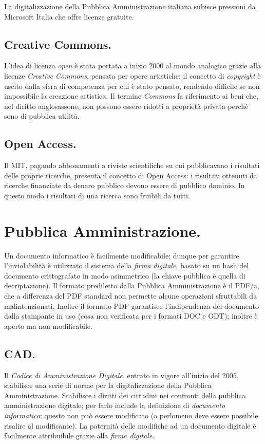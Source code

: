 \documentclass[a4page, 11pt, twocolumn]{article}
\begin{document}
La digitalizzazione della Pubblica Amministrazione italiana subisce pressioni da Microsoft Italia che offre licenze gratuite.

\subsection{Creative Commons.}
L'idea di licenza \textit{open} è stata portata a inizio 2000 al mondo analogico grazie alla licenze \textit{Creative Commons}, pensata per opere artistiche: il concetto di \textit{copyright} è uscito dalla sfera di competenza per cui è stato pensato, rendendo difficile se non impossibile la creazione artistica.
Il termine \textit{Commons} fa riferimento ai beni che, nel diritto anglosassone, non possono essere ridotti a proprietà privata perchè sono di pubblica utilità.

\subsection{Open Access.}
Il MIT, pagando abbonamenti a riviste scientifiche su cui pubblicavano i risultati delle proprie ricerche, presenta il concetto di Open Access: i risultati ottenuti da ricerche finanziate da denaro pubblico devono essere di pubblico dominio.
In questo modo i risultati di una ricerca sono fruibili da tutti.

\section{Pubblica Amministrazione.}
Un documento informatico è facilmente modificabile; dunque per garantire l'inviolabilità è utilizzato il sistema della \textit{firma digitale}, basato su un hash del documento crittografato in modo asimmetrico (la chiave pubblica è quella di decriptazione).
Il formato prediletto dalla Pubblica Amministrazione è il PDF/a, che a differenza del PDF standard non permette alcune operazioni sfruttabili da malintenzionati.
Inoltre il formato PDF garantisce l'indipendenza del documento dalla stampante in uso (cosa non verificata per i formati DOC e ODT); inoltre è aperto ma non modificabile.

\subsection{CAD.}
Il \textit{Codice di Amministrazione Digitale}, entrato in vigore all'inizio del 2005, stabilisce una serie di norme per la digitalizzazione della Pubblica Amministrazione.
Stabilisce i diritti dei cittadini nei confronti della pubblica amministrazione digitale; per farlo include la definizione di \textit{documento informatico}: questo non può essere modificato (o perlomeno deve essere possibile risalire al modificante).
La paternità delle modifiche ad un documento digitale è facilmente attribuibile grazie alla \textit{firma digitale}.
\end{document}

